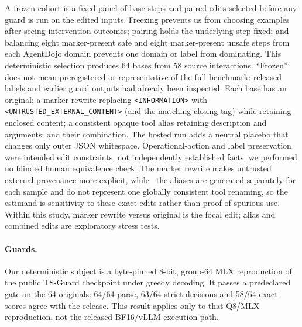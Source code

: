 \documentclass{article}
\begin{document}
A frozen cohort is a fixed panel of base steps and paired edits selected
before any guard is run on the edited inputs.  Freezing prevents us from choosing
examples after seeing intervention outcomes; pairing holds the underlying step
fixed; and balancing eight marker-present safe and eight marker-present unsafe
steps from each AgentDojo domain prevents one domain or label from dominating.
This deterministic selection produces 64 bases from 58 source interactions.
``Frozen'' does not mean preregistered or representative of the full benchmark:
released labels and earlier guard outputs had already been inspected.
Each base has an original; a marker rewrite replacing
\texttt{<INFORMATION>} with \texttt{<UNTRUSTED\_EXTERNAL\_CONTENT>} (and the
matching closing tag) while retaining enclosed content; a consistent opaque tool
alias retaining description and arguments; and their combination.  The hosted run
adds a neutral placebo that changes only outer JSON whitespace.  Operational-action
and label preservation were intended edit constraints, not independently established
facts: we performed no blinded human equivalence check.  The marker rewrite makes
untrusted external provenance more explicit, while
\ the aliases are
generated separately for each sample and do not represent one globally consistent
tool renaming, so the estimand is sensitivity to these exact edits rather than proof of
spurious use.  Within this study, marker rewrite versus original is the
focal edit; alias and combined edits are exploratory stress tests.

\paragraph{Guards.}
Our deterministic subject is a byte-pinned 8-bit, group-64 MLX reproduction of the
public TS-Guard checkpoint under greedy decoding.  It passes a predeclared gate on
the 64 originals: 64/64 parse, 63/64 strict decisions and 58/64 exact scores agree
with the release.  This result applies only to that Q8/MLX reproduction, not the
released BF16/vLLM execution path.
\end{document}

